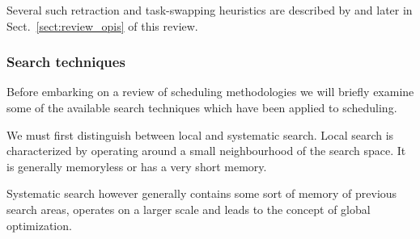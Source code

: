 Several such retraction and task-swapping heuristics are described by \citet{kramer04swapping} and later in Sect.~\ref{sect:review_opis} of this review. 


\subsubsection{Search techniques}
\label{sub:review_search}
Before embarking on a review of scheduling methodologies we will briefly examine some of the available search techniques which have been applied to scheduling. 



We must first distinguish between local and systematic search. Local search is characterized by operating around a small neighbourhood of the search space. It is generally memoryless or has a very short memory.

Systematic search however generally contains some sort of memory of previous search areas, operates on a larger scale and leads to the concept of global optimization.



